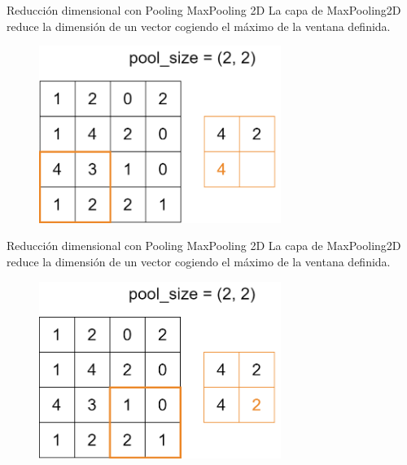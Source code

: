 \begin{frame}{Reducción dimensional con Pooling}
\alert{\Large MaxPooling 2D}
La capa de MaxPooling2D reduce la dimensión de un vector cogiendo el \alert{máximo} de la ventana definida.

\begin{figure}
    \centering
    \includegraphics[width=0.7\textwidth]{figures/Tema 3/MaxPooling_4.png}
\end{figure}
\end{frame}

\begin{frame}{Reducción dimensional con Pooling}
\alert{\Large MaxPooling 2D}
La capa de MaxPooling2D reduce la dimensión de un vector cogiendo el \alert{máximo} de la ventana definida.

\begin{figure}
    \centering
    \includegraphics[width=0.7\textwidth]{figures/Tema 3/MaxPooling_5.png}
\end{figure}
\end{frame}

